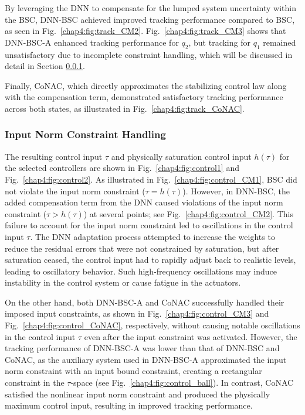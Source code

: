 By leveraging the DNN to compensate for the lumped system uncertainty within the BSC, DNN-BSC achieved improved tracking performance compared to BSC, as seen in Fig.~\ref{chap4:fig:track_CM2}. Fig.~\ref{chap4:fig:track_CM3} shows that DNN-BSC-A enhanced tracking performance for $q_2$, but tracking for $q_1$ remained unsatisfactory due to incomplete constraint handling, which will be discussed in detail in Section \ref{chap4:sec:sim:cstr input}.

Finally, CoNAC, which directly approximates the stabilizing control law along with the compensation term, demonstrated satisfactory tracking performance across both states, as illustrated in Fig.~\ref{chap4:fig:track_CoNAC}.

\subsubsection{Input Norm Constraint Handling} \label{chap4:sec:sim:cstr input}

The resulting control input $\tau$ and physically saturation control input $h(\tau)$ for the selected controllers are shown in Fig.~\ref{chap4:fig:control1} and Fig.~\ref{chap4:fig:control2}. As illustrated in Fig.~\ref{chap4:fig:control_CM1}, BSC did not violate the input norm constraint (\ie $\tau = h(\tau)$). However, in DNN-BSC, the added compensation term from the DNN caused violations of the input norm constraint (\ie $\tau > h(\tau)$) at several points; see Fig.~\ref{chap4:fig:control_CM2}. This failure to account for the input norm constraint led to oscillations in the control input $\tau$. The DNN adaptation process attempted to increase the weights to reduce the residual errors that were not constrained by saturation, but after saturation ceased, the control input had to rapidly adjust back to realistic levels, leading to oscillatory behavior. Such high-frequency oscillations may induce instability in the control system or cause fatigue in the actuators.

On the other hand, both DNN-BSC-A and CoNAC successfully handled their imposed input constraints, as shown in Fig.~\ref{chap4:fig:control_CM3} and Fig.~\ref{chap4:fig:control_CoNAC}, respectively, without causing notable oscillations in the control input $\tau$ even after the input constraint was activated. However, the tracking performance of DNN-BSC-A was lower than that of DNN-BSC and CoNAC, as the auxiliary system used in DNN-BSC-A approximated the input norm constraint with an input bound constraint, creating a rectangular constraint in the $\tau$-space (see Fig.~\ref{chap4:fig:control_ball}). In contrast, CoNAC satisfied the nonlinear input norm constraint and produced the physically maximum control input, resulting in improved tracking performance. 

